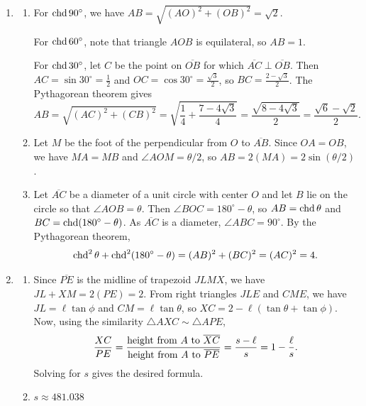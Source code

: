 \begin{enumerate}
\begin{enumerate}
\end{enumerate}
\item \begin{enumerate}
\item For $\operatorname{chd} 90^{\circ}$, we have $AB = \sqrt{(AO)^2 + (OB)^2} = \sqrt{2}$.\par
For $\operatorname{chd} 60^{\circ}$, note that triangle $AOB$ is equilateral, so $AB = 1$.\par 
For $\operatorname{chd} 30^{\circ}$, let $C$ be the point on $\overline{OB}$ for which $\overline{AC}\perp\overline{OB}$. Then $AC = \sin 30^{\circ} = \frac{1}{2}$ and $OC = \cos 30^{\circ} = \frac{\sqrt{3}}{2}$, so $BC = \frac{2 - \sqrt{3}}{2}$. The Pythagorean theorem gives
\begin{equation*}
AB = \sqrt{(AC)^2 + (CB)^2} = \sqrt{\frac{1}{4} + \frac{7 - 4\sqrt{3}}{4}} = \frac{\sqrt{8 - 4\sqrt{3}}}{2} = \frac{\sqrt{6} - \sqrt{2}}{2}.
\end{equation*}
\item Let $M$ be the foot of the perpendicular from $O$ to $\overline{AB}$. Since $OA = OB$, we have $MA = MB$ and $\angle AOM = \theta/2$, so $AB = 2(MA) = 2\sin(\theta/2)$.
\item Let $\overline{AC}$ be a diameter of a unit circle with center $O$ and let $B$ lie on the circle so that $\angle AOB = \theta$. Then $\angle BOC = 180^{\circ} - \theta$, so $AB = \operatorname{chd}\theta$ and $BC = \operatorname{chd}(180^{\circ} - \theta)$. As $\overline{AC}$ is a diameter, $\angle ABC = 90^{\circ}$. By the Pythagorean theorem,
\begin{equation*}
\operatorname{chd}^2\theta + \operatorname{chd}^2(180^{\circ} - \theta) = (AB)^2 + (BC)^2 = (AC)^2 = 4.
\end{equation*}
\end{enumerate}
\item \begin{enumerate}
\item Since $\overline{PE}$ is the midline of trapezoid $JLMX$, we have $JL + XM = 2(PE) = 2$. From right triangles $JLE$ and $CME$, we have $JL = \ell\tan\phi$ and $CM = \ell\tan\theta$, so $XC = 2 - \ell(\tan\theta + \tan\phi)$. Now, using the similarity $\triangle AXC\sim \triangle APE$,
\begin{equation*}
\frac{XC}{PE} = \frac{\text{height from \ensuremath{A} to \ensuremath{\overline{XC}}}}{\text{height from \ensuremath{A} to \ensuremath{\overline{PE}}}} = \frac{s - \ell}{s} = 1 - \frac{\ell}{s}.
\end{equation*}
Solving for $s$ gives the desired formula.
\item $s\approx 481.038$

\end{enumerate}
\end{enumerate}
